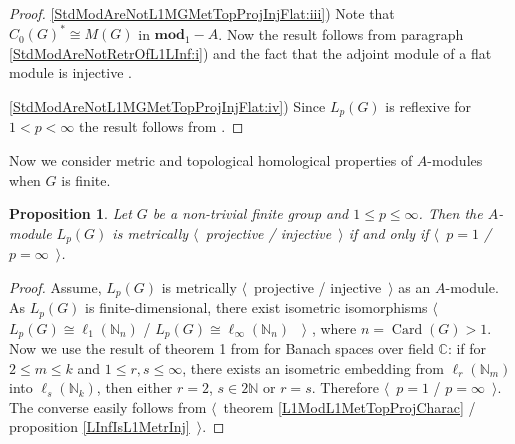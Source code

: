 \documentclass{article}
\theoremstyle{plain}
\newtheorem{proposition}{Proposition}[section]
\theoremstyle{definition}
\newtheorem{proof}{Proof}\def\theproof{}
\newcommand{\isom}{\mathop{\mathbin{\cong}}}
\begin{document}
\begin{fulltext}
\begin{proof}
\ref{StdModAreNotL1MGMetTopProjInjFlat:iii}) 
Note that $C_0(G)^*\isom M(G)$ in $\mathbf{mod}_1-A$. Now the result follows from 
paragraph \ref{StdModAreNotRetrOfL1LInf:i}) 
and the fact that the adjoint module of a flat module is injective 
\cite[proposition 2.21]{NemGeomProjInjFlatBanMod}.

\ref{StdModAreNotL1MGMetTopProjInjFlat:iv}) 
Since $L_p(G)$ is reflexive for $1<p<\infty$ the result follows from 
\cite[corollary 3.14]{NemGeomProjInjFlatBanMod}.
\end{proof}

Now we consider metric and topological homological properties of $A$-modules when 
$G$ is finite.

\begin{proposition}\label{LpFinGrL1MGMetrInjProjCharac} Let $G$ be a non-trivial finite 
group and $1\leq p\leq \infty$. Then the $A$-module $L_p(G)$ is metrically $\langle$~projective / 
injective~$\rangle$ if and only if $\langle$~$p=1$ / $p=\infty$~$\rangle$.
\end{proposition}
\begin{proof} 
Assume, $L_p(G)$ is metrically $\langle$~projective / injective~$\rangle$ as an $A$-module. 
As $L_p(G)$ is finite-dimensional, there exist isometric isomorphisms 
$\langle$~$L_p(G)\isom \ell_1(\mathbb{N}_n)$ / $L_p(G)\isom \ell_\infty(\mathbb{N}_n)$ ~$\rangle$ 
\cite[proposition 3.8, paragraphs \textup{(i)}, \textup{(ii)}]{NemGeomProjInjFlatBanMod}, 
where $n=\operatorname{Card}(G)>1$. 
Now we use the result of theorem 1 from \cite{LyubIsomEmdbFinDimLp} for Banach spaces over field 
$\mathbb{C}$: if for $2\leq m\leq k$ and $1\leq r,s\leq \infty$, there exists an isometric 
embedding from $\ell_r(\mathbb{N}_m)$ into $\ell_s(\mathbb{N}_k)$, then either $r=2$, 
$s\in 2\mathbb{N}$ or $r=s$. Therefore $\langle$~$p=1$ / $p=\infty$~$\rangle$. The converse easily 
follows from $\langle$~theorem \ref{L1ModL1MetTopProjCharac} / proposition 
\ref{LInfIsL1MetrInj}~$\rangle$.
\end{proof}


\end{fulltext}
\end{document}
